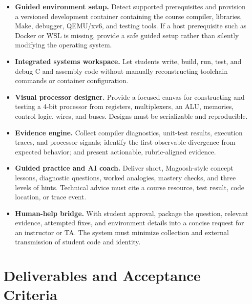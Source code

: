 \documentclass[10pt,letterpaper]{article}
\newcommand{\tightlabel}[1]{\textbf{\color{UMBlue}#1}}
\begin{document}
\begin{minipage}[t]{0.49\linewidth}
\begin{itemize}
  \item \tightlabel{Guided environment setup.} Detect supported prerequisites and provision a versioned development container containing the course compiler, libraries, Make, debugger, QEMU/xv6, and testing tools. If a host prerequisite such as Docker or WSL is missing, provide a safe guided setup rather than silently modifying the operating system.
  \item \tightlabel{Integrated systems workspace.} Let students write, build, run, test, and debug C and assembly code without manually reconstructing toolchain commands or container configuration.
  \item \tightlabel{Visual processor designer.} Provide a focused canvas for constructing and testing a 4-bit processor from registers, multiplexers, an ALU, memories, control logic, wires, and buses. Designs must be serializable and reproducible.
\end{itemize}
\end{minipage}\hfill
\begin{minipage}[t]{0.49\linewidth}
\begin{itemize}
  \item \tightlabel{Evidence engine.} Collect compiler diagnostics, unit-test results, execution traces, and processor signals; identify the first observable divergence from expected behavior; and present actionable, rubric-aligned evidence.
  \item \tightlabel{Guided practice and AI coach.} Deliver short, Magoosh-style concept lessons, diagnostic questions, worked analogies, mastery checks, and three levels of hints. Technical advice must cite a course resource, test result, code location, or trace event.
  \item \tightlabel{Human-help bridge.} With student approval, package the question, relevant evidence, attempted fixes, and environment details into a concise request for an instructor or TA. The system must minimize collection and external transmission of student code and identity.
\end{itemize}
\end{minipage}

\section*{Deliverables and Acceptance Criteria}
\end{document}

